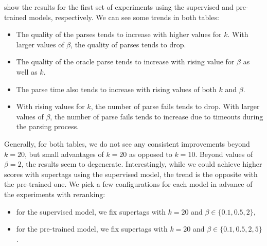 \documentclass[../../document.tex]{subfiles}
\begin{document}
     show the results for the first set of experiments using the supervised and pre-trained models, respectively.
    We can see some trends in both tables:
    \begin{itemize}
        \item The quality of the parses tends to increase with higher values for $k$.  With larger values of \(\beta\), the quality of parses tends to drop.
        \item The quality of the oracle parse tends to increase with rising value for $\beta$ as well as \(k\).
        \item The parse time also tends to increase with rising values of both \(k\) and \(\beta\).
        \item With rising values for $k$, the number of parse fails tends to drop. With larger values of \(\beta\), the number of parse fails tends to increase due to timeouts during the parsing process.
    \end{itemize}
    Generally, for both tables, we do not see any consistent improvements beyond \(k=20\), but small advantages of \(k=20\) as opposed to \(k=10\).
    Beyond values of \(\beta = 2\), the results seem to degenerate.
    Interestingly, while we could achieve higher scores with  supertags using the supervised model, the trend is the opposite with the pre-trained one.
    We pick a few configurations for each model in advance of the experiments with reranking:
    \begin{itemize}
        \item for the supervised model, we fix  supertags with \(k = 20\) and \(\beta \in \{0.1,0.5,2\}\),
        \item for the pre-trained model, we fix  supertags with \(k = 20\) and \(\beta \in \{0.1,0.5,2,5\}\).
    \end{itemize}
\end{document}
